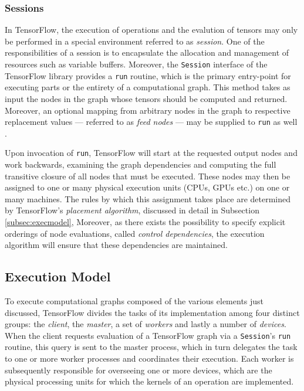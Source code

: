 \subsubsection{Sessions}\label{sec:model-graphs-sessions}

In TensorFlow, the execution of operations and the evalution of tensors may only
be performed in a special environment referred to as \emph{session}. One of the
responsibilities of a session is to encapsulate the allocation and management of
resources such as variable buffers. Moreover, the \texttt{Session} interface of
the TensorFlow library provides a \texttt{run} routine, which is the primary
entry-point for executing parts or the entirety of a computational graph. This
method takes as input the nodes in the graph whose tensors should be computed
and returned. Moreover, an optional mapping from arbitrary nodes in the graph to
respective replacement values --- referred to as \emph{feed nodes} --- may be
supplied to \texttt{run} as well \cite{tensorflow}.

Upon invocation of \texttt{run}, TensorFlow will start at the requested output
nodes and work backwards, examining the graph dependencies and computing the
full transitive closure of all nodes that must be executed. These nodes may then
be assigned to one or many physical execution units (CPUs, GPUs etc.) on one or
many machines. The rules by which this assignment takes place are determined by
TensorFlow's \emph{placement algorithm}, discussed in detail in Subsection
\ref{subsec:execmodel}, Moreover, as there exists the possibility to specify
explicit orderings of node evaluations, called \emph{control dependencies}, the
execution algorithm will ensure that these dependencies are maintained.

\subsection{Execution Model}\label{sec:model-exec}

To execute computational graphs composed of the various elements just discussed,
TensorFlow divides the tasks of its implementation among four distinct groups:
the \emph{client}, the \emph{master}, a set of \emph{workers} and lastly a
number of \emph{devices}. When the client requests evaluation of a TensorFlow
graph via a \texttt{Session}'s \texttt{run} routine, this query is sent to the
master process, which in turn delegates the task to one or more worker processes
and coordinates their execution. Each worker is subsequently responsible for
overseeing one or more devices, which are the physical processing units for
which the kernels of an operation are implemented.

